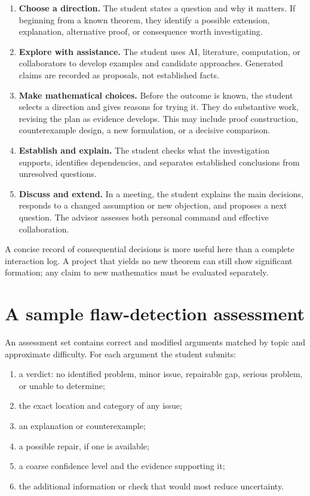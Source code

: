 \documentclass[11pt]{article}
\begin{document}
\begin{enumerate}
    \item \textbf{Choose a direction.} The student states a question and why it matters.
    If beginning from a known theorem, they identify a possible extension, explanation,
    alternative proof, or consequence worth investigating.
    \item \textbf{Explore with assistance.} The student uses AI, literature, computation,
    or collaborators to develop examples and candidate approaches. Generated claims
    are recorded as proposals, not established facts.
    \item \textbf{Make mathematical choices.} Before the outcome is known, the student
    selects a direction and gives reasons for trying it. They do substantive work,
    revising the plan as evidence develops. This may include proof construction,
    counterexample design, a new formulation, or a decisive comparison.
    \item \textbf{Establish and explain.} The student checks what the investigation
    supports, identifies dependencies, and separates established conclusions from
    unresolved questions.
    \item \textbf{Discuss and extend.} In a meeting, the student explains the main
    decisions, responds to a changed assumption or new objection, and proposes a next
    question. The advisor assesses both personal command and effective collaboration.
\end{enumerate}

A concise record of consequential decisions is more useful here than a complete
interaction log. A project that yields no new theorem can still show significant
formation; any claim to new mathematics must be evaluated separately.

\clearpage
\section{A sample flaw-detection assessment}

An assessment set contains correct and modified arguments matched by topic and approximate
difficulty.  For each argument the student submits:

\begin{enumerate}
    \item a verdict: no identified problem, minor issue, repairable gap, serious problem,
    or unable to determine;
    \item the exact location and category of any issue;
    \item an explanation or counterexample;
    \item a possible repair, if one is available;
    \item a coarse confidence level and the evidence supporting it;
    \item the additional information or check that would most reduce uncertainty.
\end{enumerate}
\end{document}

